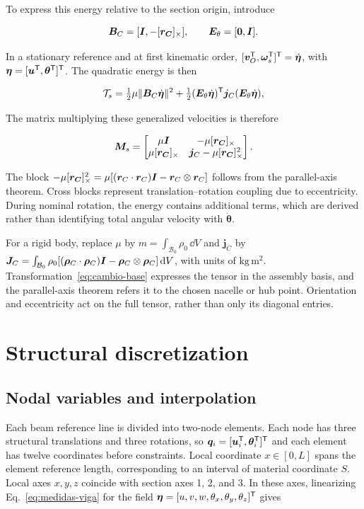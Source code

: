 To express this energy relative to the section origin, introduce

\begin{equation}
\bm B_C=[\bm I,-[\bm{r_C}]_\times],\qquad \bm E_\theta=[\bm0,\bm I].
\end{equation}

In a stationary reference and at first kinematic order, $[\bm v_O^\mathsf T,\bm\omega_s^\mathsf T]^\mathsf T=\dot{\bm\eta}$, with $\bm\eta=[\bm u^\mathsf T,\bm\theta^\mathsf T]^\mathsf T$. The quadratic energy is then

\begin{equation}
\mathcal T_s=\tfrac12\mu\|\bm B_C\dot{\bm\eta}\|^2
+\tfrac12(\bm E_\theta\dot{\bm\eta})^\mathsf T\bm j_C(\bm E_\theta\dot{\bm\eta}),
\end{equation}

The matrix multiplying these generalized velocities is therefore

\begin{equation}
\bm M_s=\begin{bmatrix}
\mu\bm I&-\mu[\bm{r_C}]_\times\\
\mu[\bm{r_C}]_\times&\bm j_C-\mu[\bm{r_C}]_\times^2
\end{bmatrix}.
\label{eq:Ms}
\end{equation}

The block $-\mu[\bm{r_C}]_\times^2=\mu[(\bm r_C\cdot\bm r_C)\bm I-\bm r_C\otimes\bm r_C]$ follows from the parallel-axis theorem. Cross blocks represent translation--rotation coupling due to eccentricity. During nominal rotation, the energy contains additional terms, which are derived rather than identifying total angular velocity with $\dot{\bm\theta}$.

For a rigid body, replace $\mu$ by $m=\int_{\mathcal B_0}\rho_0\,\dd V$ and $\bm j_C$ by $\bm J_C=\int_{\mathcal B_0}\rho_0[(\bm\rho_C\cdot\bm\rho_C)\bm I-\bm\rho_C\otimes\bm\rho_C]\,\mathrm d V$, with units of $\mathrm{kg\,m^2}$. Transformation~\eqref{eq:cambio-base} expresses the tensor in the assembly basis, and the parallel-axis theorem refers it to the chosen nacelle or hub point. Orientation and eccentricity act on the full tensor, rather than only its diagonal entries.

\section{Structural discretization}
\label{sec:elementos}
\subsection{Nodal variables and interpolation}
Each beam reference line is divided into two-node elements. Each node has three structural translations and three rotations, so $\bm q_i=[\bm u_i^\mathsf T,\bm\theta_i^\mathsf T]^\mathsf T$ and each element has twelve coordinates before constraints. Local coordinate $x\in[0,L]$ spans the element reference length, corresponding to an interval of material coordinate $S$. Local axes $x,y,z$ coincide with section axes 1, 2, and 3. In these axes, linearizing Eq.~\eqref{eq:medidas-viga} for the field $\bm\eta=[u,v,w,\theta_x,\theta_y,\theta_z]^\mathsf T$ gives

